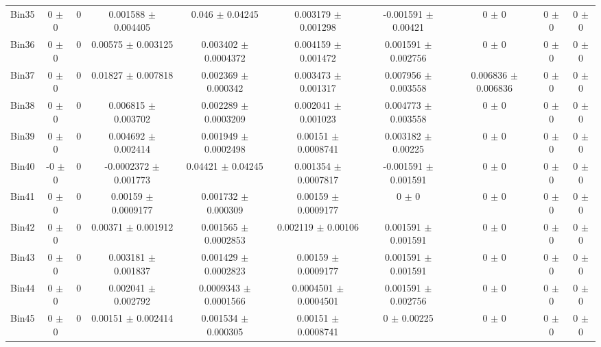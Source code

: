 \begin{tabular}{@{\extracolsep{4pt}}lccccccccc@{}}
     Bin35 & 0 $\pm$ 0 & 0 & 0.001588 $\pm$ 0.004405 & 0.046 $\pm$ 0.04245 & 0.003179 $\pm$ 0.001298 & -0.001591 $\pm$ 0.00421 & 0 $\pm$ 0 & 0 $\pm$ 0 & 0 $\pm$ 0 \\ 
     Bin36 & 0 $\pm$ 0 & 0 & 0.00575 $\pm$ 0.003125 & 0.003402 $\pm$ 0.0004372 & 0.004159 $\pm$ 0.001472 & 0.001591 $\pm$ 0.002756 & 0 $\pm$ 0 & 0 $\pm$ 0 & 0 $\pm$ 0 \\ 
     Bin37 & 0 $\pm$ 0 & 0 & 0.01827 $\pm$ 0.007818 & 0.002369 $\pm$ 0.000342 & 0.003473 $\pm$ 0.001317 & 0.007956 $\pm$ 0.003558 & 0.006836 $\pm$ 0.006836 & 0 $\pm$ 0 & 0 $\pm$ 0 \\ 
     Bin38 & 0 $\pm$ 0 & 0 & 0.006815 $\pm$ 0.003702 & 0.002289 $\pm$ 0.0003209 & 0.002041 $\pm$ 0.001023 & 0.004773 $\pm$ 0.003558 & 0 $\pm$ 0 & 0 $\pm$ 0 & 0 $\pm$ 0 \\ 
     Bin39 & 0 $\pm$ 0 & 0 & 0.004692 $\pm$ 0.002414 & 0.001949 $\pm$ 0.0002498 & 0.00151 $\pm$ 0.0008741 & 0.003182 $\pm$ 0.00225 & 0 $\pm$ 0 & 0 $\pm$ 0 & 0 $\pm$ 0 \\ 
     Bin40 & -0 $\pm$ 0 & 0 & -0.0002372 $\pm$ 0.001773 & 0.04421 $\pm$ 0.04245 & 0.001354 $\pm$ 0.0007817 & -0.001591 $\pm$ 0.001591 & 0 $\pm$ 0 & 0 $\pm$ 0 & 0 $\pm$ 0 \\ 
     Bin41 & 0 $\pm$ 0 & 0 & 0.00159 $\pm$ 0.0009177 & 0.001732 $\pm$ 0.000309 & 0.00159 $\pm$ 0.0009177 & 0 $\pm$ 0 & 0 $\pm$ 0 & 0 $\pm$ 0 & 0 $\pm$ 0 \\ 
     Bin42 & 0 $\pm$ 0 & 0 & 0.00371 $\pm$ 0.001912 & 0.001565 $\pm$ 0.0002853 & 0.002119 $\pm$ 0.00106 & 0.001591 $\pm$ 0.001591 & 0 $\pm$ 0 & 0 $\pm$ 0 & 0 $\pm$ 0 \\ 
     Bin43 & 0 $\pm$ 0 & 0 & 0.003181 $\pm$ 0.001837 & 0.001429 $\pm$ 0.0002823 & 0.00159 $\pm$ 0.0009177 & 0.001591 $\pm$ 0.001591 & 0 $\pm$ 0 & 0 $\pm$ 0 & 0 $\pm$ 0 \\ 
     Bin44 & 0 $\pm$ 0 & 0 & 0.002041 $\pm$ 0.002792 & 0.0009343 $\pm$ 0.0001566 & 0.0004501 $\pm$ 0.0004501 & 0.001591 $\pm$ 0.002756 & 0 $\pm$ 0 & 0 $\pm$ 0 & 0 $\pm$ 0 \\ 
     Bin45 & 0 $\pm$ 0 & 0 & 0.00151 $\pm$ 0.002414 & 0.001534 $\pm$ 0.000305 & 0.00151 $\pm$ 0.0008741 & 0 $\pm$ 0.00225 & 0 $\pm$ 0 & 0 $\pm$ 0 & 0 $\pm$ 0 \\ 
\hline\hline
  \end{tabular}
